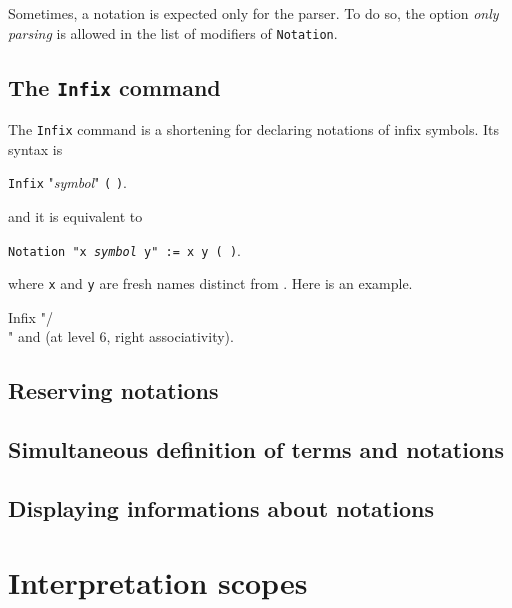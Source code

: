 \Rem
Sometimes, a notation is expected only for the parser.
To do so, the option {\em only parsing} is allowed in the list of modifiers of
\texttt{Notation}.

\subsection{The \texttt{Infix} command}

The \texttt{Infix} command is a shortening for declaring notations of
infix symbols. Its syntax is 

\medskip

\noindent\texttt{Infix} "{\em symbol}" {\qualid} {\tt (}  {\tt )}.

\medskip

and it is equivalent to

\medskip

\noindent\texttt{Notation "x {\em symbol} y" := {\qualid} x y  (  )}.

\medskip

where {\tt x} and {\tt y} are fresh names distinct from {\qualid}. Here is an example.

\begin{coq_example*}
Infix "/\\" and (at level 6, right associativity).
\end{coq_example*}

\subsection{Reserving notations}

\subsection{Simultaneous definition of terms and notations}

\subsection{Displaying informations about notations}


\section{Interpretation scopes}
\label{scopes}

